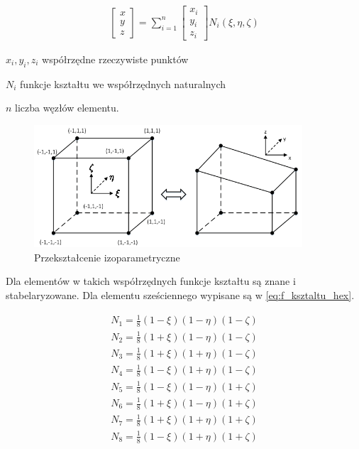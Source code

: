 \begin{gather}
	\begin{bmatrix} 
	 	x \\
		y \\
		z 
	\end{bmatrix} = \sum_{i=1}^n
	\begin{bmatrix} 
	 	x_i \\
		y_i \\
		z_i 
	\end{bmatrix} N_i(\xi, \eta, \zeta)
\end{gather}

\begin{eqwhere}[2cm]
	\item[$x_i, y_i, z_i$] współrzędne rzeczywiste punktów
	\item[$N_i$] funkcje kształtu we współrzędnych naturalnych
	\item[$n$] liczba węzłów elementu.
\end{eqwhere}

\begin{figure}[h]
\centering
\includegraphics[width=10cm]{Zdjecia/3/izoparam}
\caption{Przekształcenie izoparametryczne}
\label{fig:izoparam}
\end{figure}

Dla elementów w takich współrzędnych funkcje kształtu są znane i stabelaryzowane. Dla elementu sześciennego wypisane są w \ref{eq:f_ksztaltu_hex}.

\begin{equation} \label{eq:f_ksztaltu_hex}
	\begin{aligned}
		N_1 = \frac{1}{8}(1-\xi)(1-\eta)(1-\zeta) \\
		N_2 = \frac{1}{8}(1+\xi)(1-\eta)(1-\zeta) \\
		N_3 = \frac{1}{8}(1+\xi)(1+\eta)(1-\zeta) \\
		N_4 = \frac{1}{8}(1-\xi)(1+\eta)(1-\zeta) \\
		N_5 = \frac{1}{8}(1-\xi)(1-\eta)(1+\zeta) \\
		N_6 = \frac{1}{8}(1+\xi)(1-\eta)(1+\zeta) \\
		N_7 = \frac{1}{8}(1+\xi)(1+\eta)(1+\zeta) \\
		N_8 = \frac{1}{8}(1-\xi)(1+\eta)(1+\zeta)
	\end{aligned}
\end{equation}

